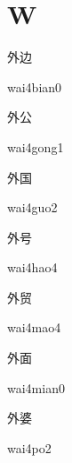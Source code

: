 ﻿%
\section*{W}

\begin{verbete}{外边}
\begin{pronuncia}{wai4bian0}
\end{pronuncia}
\end{verbete}

\begin{verbete}{外公}
\begin{pronuncia}{wai4gong1}
\end{pronuncia}
\end{verbete}

\begin{verbete}{外国}
\begin{pronuncia}{wai4guo2}
\end{pronuncia}
\end{verbete}

\begin{verbete}{外号}
\begin{pronuncia}{wai4hao4}
\end{pronuncia}
\end{verbete}

\begin{verbete}{外贸}
\begin{pronuncia}{wai4mao4}
\end{pronuncia}
\end{verbete}

\begin{verbete}{外面}
\begin{pronuncia}{wai4mian0}
\end{pronuncia}
\end{verbete}

\begin{verbete}[wai4po2]{外婆}
\begin{pronuncia}{wai4po2}
\end{pronuncia}
\end{verbete}

